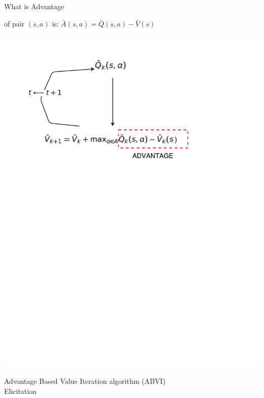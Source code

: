 \documentclass{beamer}
\newcommand{\remark}[1]{{\color{blue}{#1}}}
\begin{document}
\begin{frame}{What is Advantage}
\begin{block}{}
\remark{Advantage} of pair $(s,a)$ is:
$\bar{A}(s, a) = \bar{Q}(s, a) - \bar{V}(s)$
\end{block}

\centering
\includegraphics[scale=0.4]{figures-new/advantage}

\end{frame}

\begin{frame}
\begin{center}

Advantage Based Value Iteration algorithm (ABVI) ~\\
{\color{red} Elicitation}

\end{center}
\end{frame}
\end{document}
